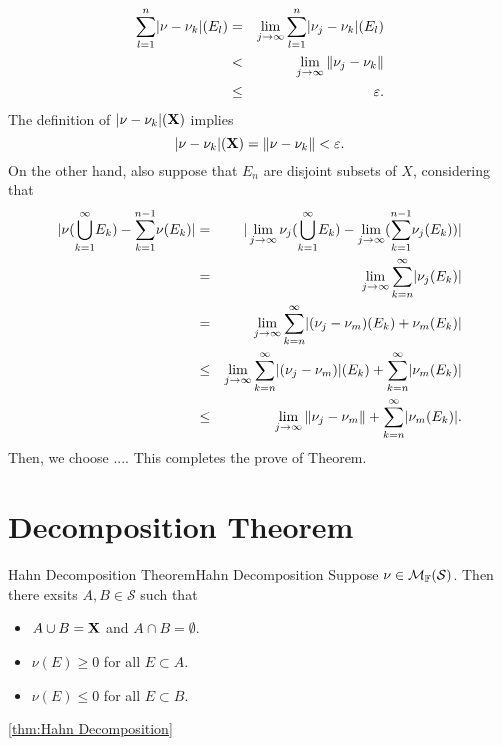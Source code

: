 \begin{Proof}
\begin{eqnarray*}
	{\sum_{l=1}^{n}}|\nu-\nu_k|(E_l) &=& \lim_{j \to \infty}{\sum_{l=1}^{n}}|\nu_j-\nu_k|(E_l)\\
	&<&\lim_{j\to \infty} \Vert \nu_j - \nu_k \Vert \\
	&\leq& \varepsilon.
\end{eqnarray*}
The definition of $|\nu-\nu_k|(\mathbf{X})$ implies 
$$
|\nu-\nu_k|(\mathbf{X}) = \Vert \nu -\nu_k \Vert < \varepsilon. 
$$
On the other hand, also suppose that $E_n$ are disjoint subsets of $X$, considering that
\begin{eqnarray*}
|\nu({\bigcup_{k=1}^{\infty}}E_k)-{\sum_{k=1}^{n-1}}\nu(E_k)| &=& |\lim_{j \to \infty}\nu_j({\bigcup_{k=1}^{\infty}}E_k)-\lim_{j \to \infty}({\sum_{k=1}^{n-1}}\nu_j(E_k))| \\
&=& \lim_{j \to \infty}{\sum_{k=n}^{\infty}}|\nu_j(E_k)|  \\
&=& \lim_{j \to \infty}{\sum_{k=n}^{\infty}}|(\nu_j-\nu_m)(E_k)+\nu_m(E_k)| \\
&\leq & \lim_{j \to \infty}{\sum_{k=n}^{\infty}}|(\nu_j-\nu_m)|(E_k)+{\sum_{k=n}^{\infty}}|\nu_m(E_k)| \\
&\leq & \lim_{j \to \infty} \Vert \nu_j - \nu_m \Vert + {\sum_{k=n}^{\infty}}|\nu_m(E_k)|.
\end{eqnarray*}
Then, we choose .... This completes the prove of Theorem.



\end{Proof}

\section{Decomposition Theorem}



\begin{stheorem}{Hahn Decomposition Theorem}{Hahn Decomposition}
Suppose $\nu \in \mathcal{M}_{\mathbb{F}}(\mathcal S)$. Then there exsits $A,B\in \mathcal S$ such that
\begin{itemize}
	\item $A\cup B=\mathbf{X}$ and $A \cap B =\emptyset$.
	\item $\nu(E) \geq 0$ for all $E \subset A$.
	\item $\nu(E) \leq 0$ for all $E \subset B$.
\end{itemize}
\end{stheorem}
\ref{thm:Hahn Decomposition}

